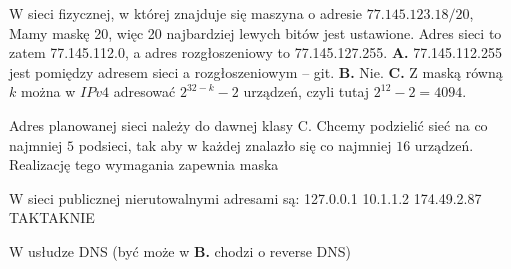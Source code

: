 \begin{solutions}
    \sol W sieci fizycznej, w której znajduje się maszyna o adresie $77.145.123.18/20$,
    Mamy maskę 20, więc 20 najbardziej lewych bitów jest ustawione. Adres sieci to zatem 77.145.112.0, a adres rozgłoszeniowy to 77.145.127.255. \textbf{A.} 77.145.112.255 jest pomiędzy adresem sieci a rozgłoszeniowym -- git. \textbf{B.} Nie. \textbf{C.} Z maską równą $k$ można w $IPv4$ adresować $2^{32-k}-2$ urządzeń, czyli tutaj $2^{12}-2=4094$.

    \sol Adres planowanej sieci należy do dawnej klasy C. Chcemy podzielić sieć na co najmniej $5$ podsieci, tak aby w każdej znalazło się co najmniej $16$ urządzeń. Realizację tego wymagania zapewnia maska

    \sol W sieci publicznej nierutowalnymi adresami są:
    \answerss
    {127.0.0.1}
    {10.1.1.2}
    {174.49.2.87}
    {TAK}{TAK}{NIE}

    \sol W usłudze DNS
    (być może w \textbf{B.} chodzi o reverse DNS)
\end{solutions}